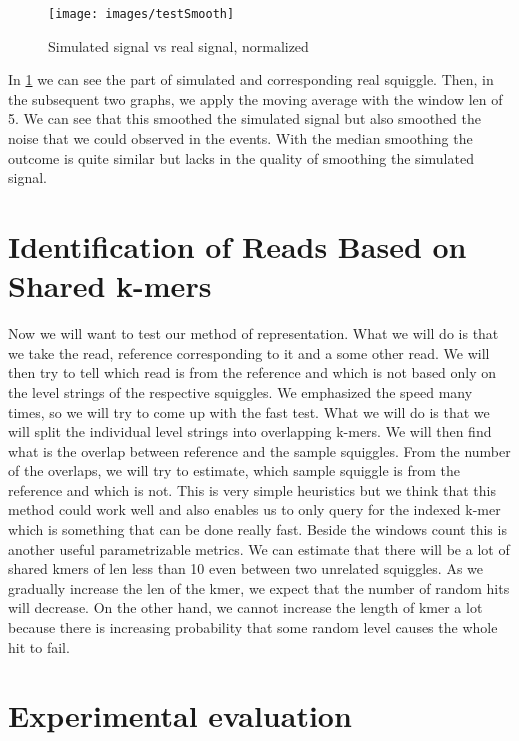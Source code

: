 \begin{figure}
\centerline{\texttt{[image: images/testSmooth]}}
\caption[Hehe]{Simulated signal vs real signal, normalized}
\label{obr:testSmooth}
\end{figure}

In \ref{obr:testSmooth} we can see the part of simulated and corresponding real squiggle.
Then, in the subsequent two graphs, we apply the moving average with the window len
of 5. We can see that this smoothed the simulated signal but also smoothed the noise
that we could observed in the events. With the median smoothing the outcome is quite
similar but lacks in the quality of smoothing the simulated signal.

\section{Identification of Reads Based on Shared k-mers}

Now we will want to test our method of representation. What we will do is that we
take the read, reference corresponding to it and a some other read. We will then
try to tell which read is from the reference and which is not based only on the
level strings of the respective squiggles. We emphasized the speed many times, so
we will try to come up with the fast test. What we will do is that we will split the
individual level strings into overlapping k-mers. We will then find what is the overlap
between reference and the sample squiggles. From the number of the overlaps, we will try
to estimate, which sample squiggle is from the reference and which is not. This is very
simple heuristics but we think that this method could work well and also enables us
to only query for the indexed k-mer which is something that can be done really fast.
Beside the windows count this is another useful parametrizable metrics. We can estimate
that there will be a lot of shared kmers of len less than 10 even between two unrelated
squiggles. As we gradually increase the len of the kmer, we expect that the number
of random hits will decrease. On the other hand, we cannot increase the length of kmer
a lot because there is increasing probability that some random level causes the
whole hit to fail.

\section{Experimental evaluation}

